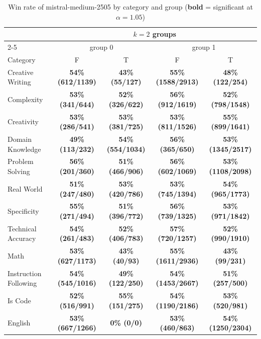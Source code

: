 \begin{table}[ht]
\centering
\scriptsize
\setlength{\tabcolsep}{3pt}
\renewcommand{\arraystretch}{1.2}
\caption{Win rate of mistral-medium-2505 by category and group (\textbf{bold} = significant at $\alpha=1.05$)}
\label{tab:winrate_2}
\begin{tabular}{lcccc}
\toprule
 & \multicolumn{4}{c}{$k=2$ groups} \\
\cmidrule(lr){2-5}
 & \multicolumn{2}{c}{group 0} & \multicolumn{2}{c}{group 1} \\
Category & F & T & F & T \\
\midrule
Creative Writing & \textbf{54\% (612/1139)} & \textbf{43\% (55/127)} & \textbf{55\% (1588/2913)} & \textbf{48\% (122/254)} \\
Complexity & \textbf{53\% (341/644)} & \textbf{52\% (326/622)} & \textbf{56\% (912/1619)} & \textbf{52\% (798/1548)} \\
Creativity & \textbf{53\% (286/541)} & \textbf{53\% (381/725)} & \textbf{53\% (811/1526)} & \textbf{55\% (899/1641)} \\
Domain Knowledge & \textbf{49\% (113/232)} & \textbf{54\% (554/1034)} & \textbf{56\% (365/650)} & \textbf{53\% (1345/2517)} \\
Problem Solving & \textbf{56\% (201/360)} & \textbf{51\% (466/906)} & \textbf{56\% (602/1069)} & \textbf{53\% (1108/2098)} \\
Real World & \textbf{51\% (247/480)} & \textbf{53\% (420/786)} & \textbf{53\% (745/1394)} & \textbf{54\% (965/1773)} \\
Specificity & \textbf{55\% (271/494)} & \textbf{51\% (396/772)} & \textbf{56\% (739/1325)} & \textbf{53\% (971/1842)} \\
Technical Accuracy & \textbf{54\% (261/483)} & \textbf{52\% (406/783)} & \textbf{57\% (720/1257)} & \textbf{52\% (990/1910)} \\
Math & \textbf{53\% (627/1173)} & \textbf{43\% (40/93)} & \textbf{55\% (1611/2936)} & \textbf{43\% (99/231)} \\
Instruction Following & \textbf{54\% (545/1016)} & \textbf{49\% (122/250)} & \textbf{54\% (1453/2667)} & \textbf{51\% (257/500)} \\
Is Code & \textbf{52\% (516/991)} & \textbf{55\% (151/275)} & \textbf{54\% (1190/2186)} & \textbf{53\% (520/981)} \\
English & \textbf{53\% (667/1266)} & \textbf{0\% (0/0)} & \textbf{53\% (460/863)} & \textbf{54\% (1250/2304)} \\
\bottomrule
\end{tabular}
\end{table}